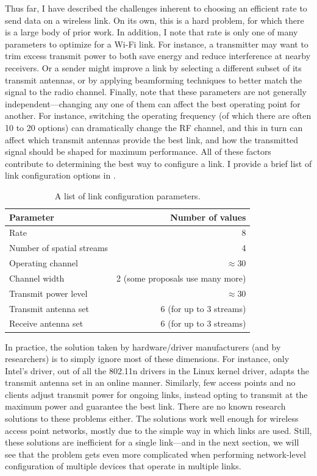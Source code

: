Thus far, I have described the challenges inherent to choosing an efficient rate to send data on a wireless link. On its own, this is a hard problem, for which there is a large body of prior work. In addition, I note that rate is only one of many parameters to optimize for a Wi-Fi link. For instance, a transmitter may want to trim excess transmit power to both save energy and reduce interference at nearby receivers. Or a sender might improve a link by selecting a different subset of its transmit antennas, or by applying beamforming techniques to better match the signal to the radio channel. Finally, note that these parameters are not generally independent---changing any one of them can affect the best operating point for another. For instance, switching the operating frequency (of which there are often 10 to 20 options) can dramatically change the RF channel, and this in turn can affect which transmit antennas provide the best link, and how the transmitted signal should be shaped for maximum performance. All of these factors contribute to determining the best way to configure a link. I provide a brief list of link configuration options in .

\begin{table}[tp]
	\centering
	\begin{tabular}{lr}
	\toprule
		Parameter & Number of values \\
	\midrule
		Rate & 8 \\
		Number of spatial streams & 4\\
		Operating channel & $\approx$30 \\
		Channel width & 2 (some proposals use many more)\\
		Transmit power level & $\approx$30 \\
		Transmit antenna set & 6 (for up to 3 streams) \\
		Receive antenna set & 6 (for up to 3 streams) \\
	\bottomrule
	\end{tabular}
	\caption[A list of link configuration parameters]{\label{tab:intro_link_config}A list of link configuration parameters.}
\end{table}


In practice, the solution taken by hardware/driver manufacturers (and by researchers) is to simply ignore most of these dimensions. For instance, only Intel's  driver, out of all the 802.11n drivers in the Linux kernel driver, adapts the transmit antenna set in an online manner. Similarly, few access points and no clients adjust transmit power for ongoing links, instead opting to transmit at the maximum power and guarantee the best link. There are no known research solutions to these problems either. The solutions work well enough for wireless access point networks, mostly due to the simple way in which links are used. Still, these solutions are inefficient for a single link---and in the next section, we will see that the problem gets even more complicated when performing network-level configuration of multiple devices that operate in multiple links.


